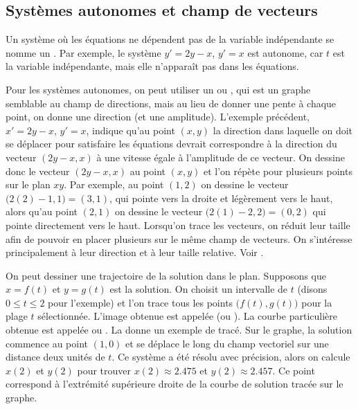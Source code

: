 \subsection{Systèmes autonomes et champ de vecteurs}

Un système où les équations ne dépendent pas de la variable indépendante se nomme un  \emph{}.  Par exemple, le système $y'=2y-x$, $y'=x$ est autonome, car $t$ est la variable indépendante, mais elle n’apparaît pas dans les équations.

Pour les systèmes autonomes, on peut utiliser un
\emph{} ou \emph{},
qui est un graphe semblable au champ de directions, mais au lieu de donner une pente à chaque point, on donne une direction (et une amplitude). L’exemple précédent, $x' = 2y-x$, $y' = x$, indique qu’au point $(x,y)$ la direction dans laquelle on doit se déplacer pour satisfaire les équations devrait correspondre à la direction du vecteur $( 2y-x, x )$
à une vitesse égale à l'amplitude de ce vecteur. On dessine donc le vecteur $(2y-x,x)$ au point $(x,y)$ et l'on répète pour plusieurs points sur le plan $xy$.
Par exemple, au point $(1,2)$ on dessine le vecteur
$\bigl(2(2)-1,1\bigr) = (3,1)$,
qui pointe vers la droite et légèrement vers le haut, alors qu’au point $(2,1)$ on dessine le vecteur $\bigl(2(1)-2,2\bigr) = (0,2)$
qui pointe directement vers le haut.
Lorsqu’on trace les vecteurs, on réduit leur taille afin de pouvoir en placer plusieurs sur le même champ de vecteurs. On s’intéresse principalement à leur direction et à leur taille relative.  Voir
.

On peut dessiner une trajectoire de la solution dans le plan. Supposons que $x = f(t)$ et $y=g(t)$ est la solution.  On choisit un intervalle de $t$ (disons $0 \leq t \leq 2$ pour l’exemple) et l'on trace tous les points
$\bigl(f(t),g(t)\bigr)$ pour la plage $t$ sélectionnée. L’image obtenue est appelée \emph{}
(ou ).
La courbe particulière obtenue est appelée \emph{} ou \emph{}.
La  donne un exemple de tracé.
Sur le graphe, la solution commence au point $(1,0)$ et se déplace le long du champ vectoriel sur une distance deux unités de $t$.  Ce système a été résolu avec précision, alors on calcule $x(2)$ et $y(2)$ pour trouver
$x(2) \approx 2.475$ et $y(2) \approx 2.457$.  Ce point correspond à l’extrémité supérieure droite de la courbe de solution tracée sur le graphe.

